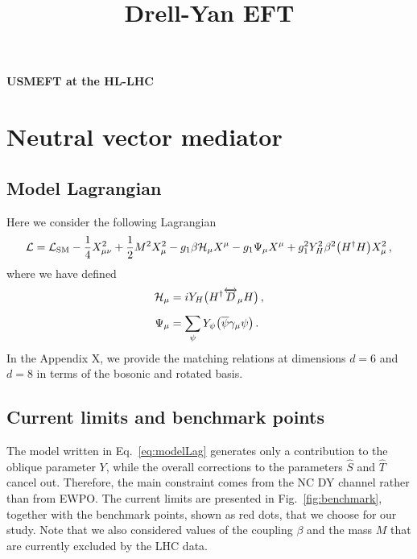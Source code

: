 \documentclass[11pt]{article}
\begin{document}
\title{Drell-Yan EFT}

\thispagestyle{empty}
\begin{flushright}


 \vspace*{2.mm}{\color{red}{Modified: \today}}
\end{flushright}

\begin{center}
  {\bf {\LARGE USMEFT at the HL-LHC}}
\end{center}

\renewcommand*{\thefootnote}{\fnsymbol{footnote}}
\setcounter{footnote}{3}

\section{Neutral vector mediator}

\subsection{Model Lagrangian}

Here we consider the following Lagrangian
\begin{equation}
    {\cal L} = {\cal L}_\text{SM} - \dfrac{1}{4} X^2_{\mu\nu} + \dfrac{1}{2} M^2 X^2_\mu - g_1 \beta {\cal H}_\mu X^\mu - g_1 \Psi_\mu X^\mu + g_1^2 Y_H^2 \beta^2 \big (H^\dagger H\big) X_\mu^2\,,
    \label{eq:modelLag}
\end{equation}
where we have defined
\begin{align}
    {\cal H}_\mu &= iY_H \big(H^\dagger \overleftrightarrow{D}_\mu H\big)\,,\\[0.5em]
    \Psi_\mu &= \sum_\psi Y_\psi \big( \overline{\psi} \gamma_\mu \psi\big)\,.
\end{align}
In the Appendix {\color{red} X}, we provide the matching relations at dimensions $d=6$ and $d=8$ in terms of the bosonic and rotated basis.

\subsection{Current limits and benchmark points}

The model written in Eq.~\eqref{eq:modelLag} generates only a contribution to the oblique parameter $Y$, while the overall corrections to the parameters $\widehat S$ and $\widehat T$ cancel out. Therefore, the main constraint comes from the NC DY channel rather than from EWPO. The current limits are presented in Fig.~\ref{fig:benchmark}, together with the benchmark points, shown as red dots, that we choose for our study. Note that we also considered values of the coupling $\beta$ and the mass $M$ that are currently excluded by the LHC data.
\end{document}
